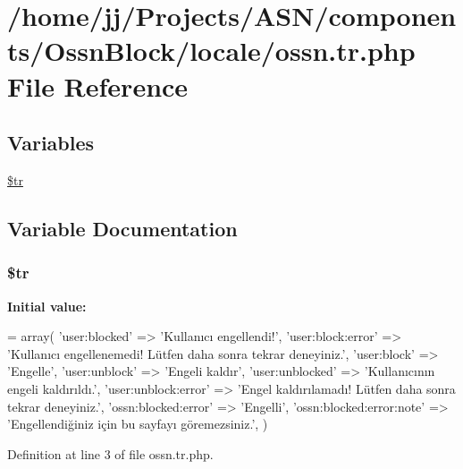 \hypertarget{components_2_ossn_block_2locale_2ossn_8tr_8php}{}\section{/home/jj/\+Projects/\+A\+S\+N/components/\+Ossn\+Block/locale/ossn.tr.\+php File Reference}
\label{components_2_ossn_block_2locale_2ossn_8tr_8php}
\subsection*{Variables}
\begin{DoxyCompactItemize}
\item 
\hyperlink{components_2_ossn_block_2locale_2ossn_8tr_8php_a925f466a276b200c71b2567d39b4dba7}{\$tr}
\end{DoxyCompactItemize}


\subsection{Variable Documentation}
\subsubsection[{\texorpdfstring{\$tr}{$tr}}]{\setlength{\rightskip}{0pt plus 5cm}\$tr}\hypertarget{components_2_ossn_block_2locale_2ossn_8tr_8php_a925f466a276b200c71b2567d39b4dba7}{}\label{components_2_ossn_block_2locale_2ossn_8tr_8php_a925f466a276b200c71b2567d39b4dba7}
{\bfseries Initial value\+:}
\begin{DoxyCode}
= array(
    \textcolor{stringliteral}{'user:blocked'} => \textcolor{stringliteral}{'Kullanıcı engellendi!'},
    \textcolor{stringliteral}{'user:block:error'} => \textcolor{stringliteral}{'Kullanıcı engellenemedi! Lütfen daha sonra tekrar deneyiniz.'},
    \textcolor{stringliteral}{'user:block'} => \textcolor{stringliteral}{'Engelle'},
    \textcolor{stringliteral}{'user:unblock'} => \textcolor{stringliteral}{'Engeli kaldır'},
    \textcolor{stringliteral}{'user:unblocked'} => \textcolor{stringliteral}{'Kullanıcının engeli kaldırıldı.'},
    \textcolor{stringliteral}{'user:unblock:error'} => \textcolor{stringliteral}{'Engel kaldırılamadı! Lütfen daha sonra tekrar deneyiniz.'},
    \textcolor{stringliteral}{'ossn:blocked:error'} => \textcolor{stringliteral}{'Engelli'},
    \textcolor{stringliteral}{'ossn:blocked:error:note'} => \textcolor{stringliteral}{'Engellendiğiniz için bu sayfayı göremezsiniz.'},
)
\end{DoxyCode}


Definition at line 3 of file ossn.\+tr.\+php.

